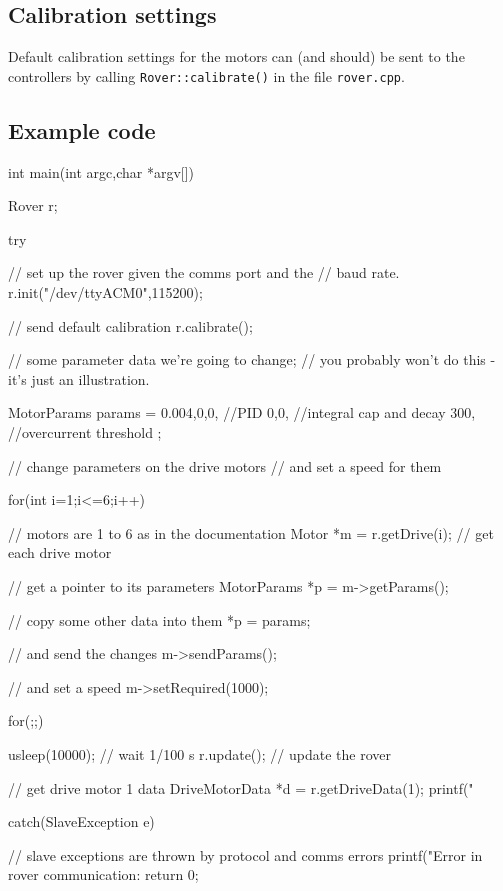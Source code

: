 \subsection{Calibration settings}
Default calibration settings for the motors can (and should) be sent
to the controllers by calling
\texttt{Rover::calibrate()} in the file \texttt{rover.cpp}.



\subsection{Example code}
\begin{v}
int main(int argc,char *argv[]){
    Rover r;
    
    try {
        // set up the rover given the comms port and the
        // baud rate.
        r.init("/dev/ttyACM0",115200);
        
        // send default calibration
        r.calibrate();
        
        // some parameter data we're going to change;
        // you probably won't do this - it's just an illustration.

        MotorParams params = {
            0.004,0,0,   //PID
            0,0,         //integral cap and decay
            300,         //overcurrent threshold
        };
        
        // change parameters on the drive motors
        // and set a speed for them
        
        for(int i=1;i<=6;i++) { // motors are 1 to 6 as in the documentation
            Motor *m = r.getDrive(i); // get each drive motor

            // get a pointer to its parameters
            MotorParams *p = m->getParams();

            // copy some other data into them
            *p = params;

            // and send the changes
            m->sendParams();

            // and set a speed
            m->setRequired(1000);
        }
        
        for(;;){
            usleep(10000); // wait 1/100 s
            r.update(); // update the rover

            // get drive motor 1 data
            DriveMotorData *d = r.getDriveData(1);
            printf("%
        }   
        
    } catch(SlaveException e) {

        // slave exceptions are thrown by protocol and comms errors
        printf("Error in rover communication: %
        return 0;
    }
}        
    

\end{v}


